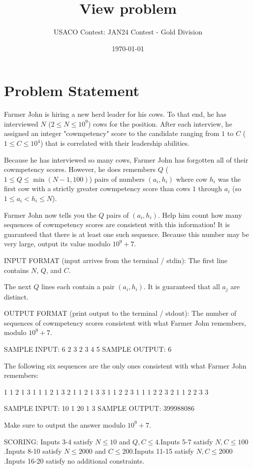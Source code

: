 \documentclass[12pt]{article}
\title{View problem}
\author{USACO Contest: JAN24 Contest - Gold Division}
\date{\today}
\begin{document}
\maketitle

\section*{Problem Statement}


Farmer John is hiring a new herd leader for his cows. To that end, he has
interviewed $N$ ($2 \leq N \leq 10^9$) cows for the position. After each
interview, he assigned an integer "cowmpetency" score to the candidate ranging from $1$
to $C$ ($1 \leq C \leq 10^4$) that is correlated with their leadership
abilities.

Because he has interviewed so many cows, Farmer John has forgotten all of their
cowmpetency scores. However, he does remembers $Q$
($1 \leq Q \leq \min(N - 1, 100)$) pairs of numbers $(a_i, h_i)$ where cow $h_i$
was the first cow with a strictly greater cowmpetency score than cows $1$
through $a_i$ (so
$1 \leq a_i < h_i \leq N$).

Farmer John now tells you the $Q$ pairs of $(a_i, h_i)$. Help him count how many
sequences of cowmpetency scores are consistent with this information! It is
guaranteed that there is at least one such sequence. Because this number may be
very large, output its value modulo $10^9 + 7$.

INPUT FORMAT (input arrives from the terminal / stdin):
The first line contains $N$, $Q$, and $C$.

The next $Q$ lines each contain a pair $(a_i, h_i)$. It is guaranteed that all
$a_j$ are distinct.

OUTPUT FORMAT (print output to the terminal / stdout):
The number of sequences of cowmpetency scores consistent with what Farmer John
remembers, modulo $10^9+7$.

SAMPLE INPUT:
6 2 3
2 3
4 5
SAMPLE OUTPUT: 
6

The following six sequences are the only ones consistent with what Farmer John
remembers:


1 1 2 1 3 1
1 1 2 1 3 2
1 1 2 1 3 3
1 1 2 2 3 1
1 1 2 2 3 2
1 1 2 2 3 3

SAMPLE INPUT:
10 1 20
1 3
SAMPLE OUTPUT: 
399988086

Make sure to output the answer modulo $10^9+7$.

SCORING:
Inputs 3-4 satisfy $N \leq 10$ and $Q, C \leq 4$.Inputs 5-7
satisfy $N, C \leq 100$.Inputs 8-10 satisfy $N \leq 2000$ and
$C \leq 200$.Inputs 11-15 satisfy $N, C \leq 2000$.Inputs
16-20 satisfy no additional constraints.
\end{document}
